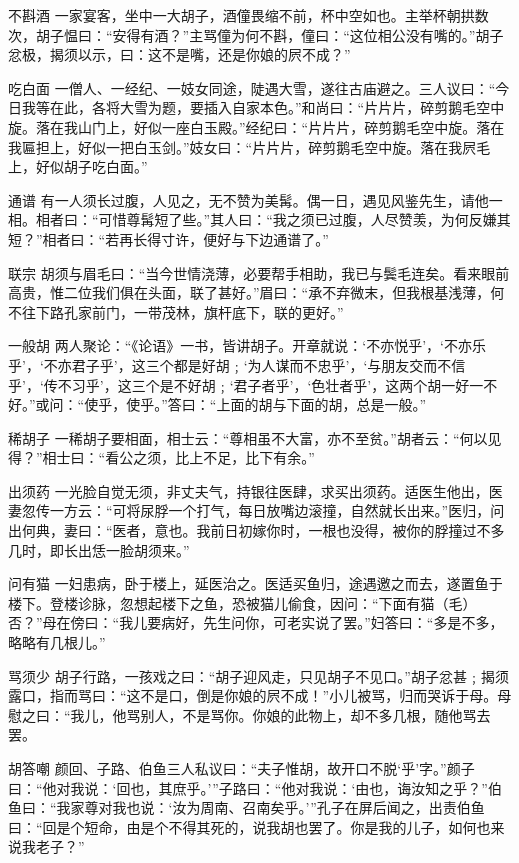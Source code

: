 \documentclass[12pt,UTF8]{ctexbook}
\begin{document}
不斟酒
一家宴客，坐中一大胡子，酒僮畏缩不前，杯中空如也。主举杯朝拱数次，胡子愠曰：“安得有酒？”主骂僮为何不斟，僮曰：“这位相公没有嘴的。”胡子忿极，揭须以示，曰：这不是嘴，还是你娘的屄不成？”

吃白面
一僧人、一经纪、一妓女同途，陡遇大雪，遂往古庙避之。三人议曰：“今日我等在此，各将大雪为题，要插入自家本色。”和尚曰：“片片片，碎剪鹅毛空中旋。落在我山门上，好似一座白玉殿。”经纪曰：“片片片，碎剪鹅毛空中旋。落在我匾担上，好似一把白玉剑。”妓女曰：“片片片，碎剪鹅毛空中旋。落在我屄毛上，好似胡子吃白面。”

通谱
有一人须长过腹，人见之，无不赞为美髯。偶一日，遇见风鉴先生，请他一相。相者曰：“可惜尊髯短了些。”其人曰：“我之须已过腹，人尽赞羡，为何反嫌其短？”相者曰：“若再长得寸许，便好与下边通谱了。”

联宗
胡须与眉毛曰：“当今世情浇薄，必要帮手相助，我已与鬓毛连矣。看来眼前高贵，惟二位我们俱在头面，联了甚好。”眉曰：“承不弃微末，但我根基浅薄，何不往下路孔家前门，一带茂林，旗杆底下，联的更好。”

一般胡
两人聚论：“《论语》一书，皆讲胡子。开章就说：‘不亦悦乎’，‘不亦乐乎’，‘不亦君子乎’，这三个都是好胡﹔‘为人谋而不忠乎’，‘与朋友交而不信乎’，‘传不习乎’，这三个是不好胡﹔‘君子者乎’，‘色壮者乎’，这两个胡一好一不好。”或问：“使乎，使乎。”答曰：“上面的胡与下面的胡，总是一般。”

稀胡子
一稀胡子要相面，相士云：“尊相虽不大富，亦不至贫。”胡者云：“何以见得？”相士曰：“看公之须，比上不足，比下有余。”

出须药
一光脸自觉无须，非丈夫气，持银往医肆，求买出须药。适医生他出，医妻忽传一方云：“可将尿脬一个打气，每日放嘴边滚撞，自然就长出来。”医归，问出何典，妻曰：“医者，意也。我前日初嫁你时，一根也没得，被你的脬撞过不多几时，即长出恁一脸胡须来。”

问有猫
一妇患病，卧于楼上，延医治之。医适买鱼归，途遇邀之而去，遂置鱼于楼下。登楼诊脉，忽想起楼下之鱼，恐被猫儿偷食，因问：“下面有猫（毛）否？”母在傍曰：“我儿要病好，先生问你，可老实说了罢。”妇答曰：“多是不多，略略有几根儿。”

骂须少
胡子行路，一孩戏之曰：“胡子迎风走，只见胡子不见口。”胡子忿甚﹔揭须露口，指而骂曰：“这不是口，倒是你娘的屄不成！”小儿被骂，归而哭诉于母。母慰之曰：“我儿，他骂别人，不是骂你。你娘的此物上，却不多几根，随他骂去罢。

胡答嘲
颜回、子路、伯鱼三人私议曰：“夫子惟胡，故开口不脱‘乎’字。”颜子曰：“他对我说：‘回也，其庶乎。’”子路曰：“他对我说：‘由也，诲汝知之乎？”伯鱼曰：“我家尊对我也说：‘汝为周南、召南矣乎。’”孔子在屏后闻之，出责伯鱼曰：“回是个短命，由是个不得其死的，说我胡也罢了。你是我的儿子，如何也来说我老子？”
\end{document}
